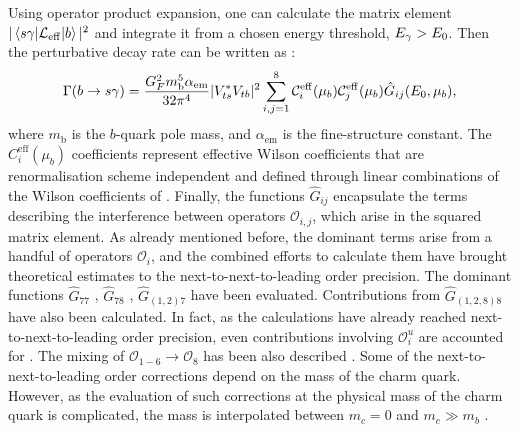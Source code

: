 Using operator product expansion, one can calculate the matrix element $|\mel*{s\gamma}{\mathcal{L}_{\mathrm{eff}}}{b}|^2$ and integrate it from a chosen energy threshold, ${E_{\gamma}}>E_0$. 
Then the perturbative decay rate can be written as \cite{Misiak:2020vlo}:
\begin{equation}\label{eq:theory_decay_rate}
    \Gamma(b\rightarrow s\gamma) = \frac{G^2_F m_{\mathrm{b}}^5 \alpha_{\mathrm{em}}}{32\pi^4}|V_{ts}^*V_{tb}|^2\sum_{i,j=1}^8\mathcal{C}^{\mathrm{eff}}_{i}(\mu_b)\mathcal{C}^{\mathrm{eff}}_{j}(\mu_b)\hat{G}_{ij}(E_0,\mu_b),
\end{equation}
where $m_{\mathrm{b}}$ is the $b$-quark pole mass, and $\alpha_{\mathrm{em}}$ is the fine-structure constant.
The $C_{i}^{\mathrm{eff}}(\mu_b)$ coefficients represent effective Wilson coefficients \cite{Buras:1993xp} that are renormalisation scheme independent and defined through linear combinations of the Wilson coefficients of .
Finally, the functions $\hat{G}_{ij}$ encapsulate the terms describing the interference between operators $\mathcal{O}_{i,j}$, which arise in the squared matrix element.
As already mentioned before, the dominant terms arise from a handful of operators $\mathcal{O}_i$, and the combined efforts to calculate them have brought \BtoXsgamma theoretical estimates to the next-to-next-to-leading order precision.
The dominant functions $\hat{G}_{77}$ \cite{Asatrian:2006rq}, $\hat{G}_{78}$ \cite{Asatrian:2010rq}, $\hat{G}_{(1,2)7}$ \cite{Boughezal:2007ny,Misiak:2020vlo} have been evaluated.
Contributions from $\hat{G}_{(1,2,8)8}$ \cite{Ferroglia:2010xe,Misiak:2010tk} have also been calculated.
In fact, as the calculations have already reached next-to-next-to-leading order precision, even contributions involving $\mathcal{O}_{i}^u$ are accounted for \cite{Huber:2014nna}.
The mixing of $\mathcal{O}_{1-6}\to\mathcal{O}_8$ has been also described \cite{Czakon:2006ss}. 
Some of the next-to-next-to-leading order corrections depend on the mass of the charm quark.
However, as the evaluation of such corrections at the physical mass of the charm quark is complicated, the mass is interpolated between $m_c=0$ and $m_c\gg m_b$ \cite{Misiak:2019ccp}.

